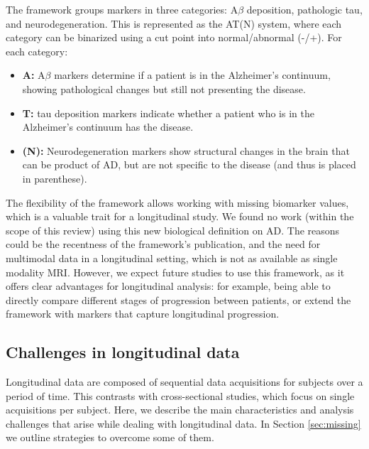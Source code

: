 The framework groups markers in three categories: A$\beta$ deposition, pathologic tau, and neurodegeneration. This is represented as the AT(N) system, where each category can be binarized using a cut point into normal/abnormal (-/+). For each category:

\begin{itemize}
    \item \textbf{A:} A$\beta$ markers determine if a patient is in the Alzheimer's continuum, showing pathological changes but still not presenting the disease.
    \item \textbf{T:} tau deposition markers indicate whether a patient who is in the Alzheimer's continuum has the disease.
    \item \textbf{(N):} Neurodegeneration markers show structural changes in the brain that can be product of AD, but are not specific to the disease (and thus is placed in parenthese).
\end{itemize}

The flexibility of the framework allows working with missing biomarker values, which is a valuable trait for a longitudinal study. We found no work (within the scope of this review) using this new biological definition on AD. The reasons could be the recentness of the framework's publication, and the need for multimodal data in a longitudinal setting, which is not as available as single modality MRI. However, we expect future studies to use this framework, as it offers clear advantages for longitudinal analysis: for example, being able to directly compare different stages of progression between patients, or extend the framework with markers that capture longitudinal progression.

\subsection{Challenges in longitudinal data}

Longitudinal data are composed of sequential data acquisitions for subjects over a period of time. This contrasts with cross-sectional studies, which focus on single acquisitions per subject. Here, we describe the main characteristics and analysis challenges that arise while dealing with longitudinal data. In Section \ref{sec:missing} we outline strategies to overcome some of them.  \\

